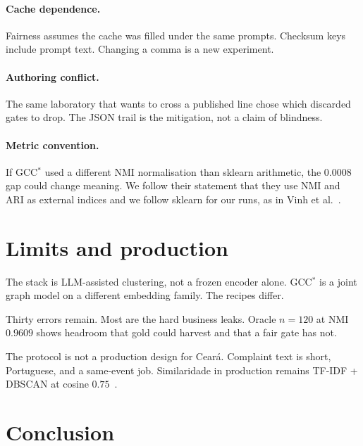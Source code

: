 \documentclass[11pt,a4paper]{article}
\begin{document}
\paragraph{Cache dependence.}
Fairness assumes the cache was filled under the same prompts.
Checksum keys include prompt text. Changing a comma is a new
experiment.

\paragraph{Authoring conflict.}
The same laboratory that wants to cross a published line
chose which discarded gates to drop. The JSON trail is the
mitigation, not a claim of blindness.

\paragraph{Metric convention.}
If GCC$^*$ used a different NMI normalisation than sklearn
arithmetic, the $0.0008$ gap could change meaning. We follow
their statement that they use NMI and ARI as external
indices and we follow sklearn for our runs, as in Vinh et
al.~\cite{vinh2010nmi}.

\section{Limits and production}

The stack is LLM-assisted clustering, not a frozen encoder
alone. GCC$^*$ is a joint graph model on a different
embedding family. The recipes differ.

Thirty errors remain. Most are the hard business leaks.
Oracle $n=120$ at NMI $0.9609$ shows headroom that gold
could harvest and that a fair gate has not.

The protocol is not a production design for Cear\'{a}.
Complaint text is short, Portuguese, and a same-event job.
Similaridade in production remains TF-IDF + DBSCAN at
cosine $0.75$~\cite{ester1996dbscan,salton1988term}.

\section{Conclusion}
\end{document}
